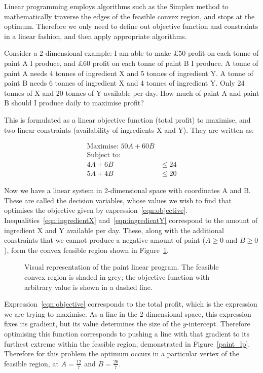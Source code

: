 Linear programming employs algorithms such as the Simplex method to
mathematically traverse the edges of the feasible convex region, and stops at
the optimum. Therefore we only need to define out objective function and
constraints in a linear fashion, and then apply appropriate algorithms.

Consider a 2-dimensional example: I am able to make $\pounds 50$ profit on each
tonne of paint A I produce, and $\pounds 60$ profit on each tonne of paint B I
produce. A tonne of paint A needs 4 tonnes of ingredient X and 5 tonnes of
ingredient Y. A tonne of paint B needs 6 tonnes of ingredient X and 4 tonnes of
ingredient Y. Only 24 tonnes of X and 20 tonnes of Y available per day. How much
of paint A and paint B should I produce daily to maximise profit?

This is formulated as a linear objective function (total profit) to maximise,
and two linear constraints (availability of ingredients X and Y). They are
written as:

\begin{align}
\text{Maximise: } 50 A + 60 B & \\\label{eqn:objective}
\text{Subject to: } & \nonumber \\
4 A + 6 B &\leq 24 \\\label{eqn:ingredientX}
5 A + 4 B &\leq 20 \label{eqn:ingredientY}
\end{align}

Now we have a linear system in 2-dimensional space with coordinates A and B.
These are called the decision variables, whose values we wish to find that
optimises the objective given by expression~\ref{eqn:objective}.
Inequalities~\ref{eqn:ingredientX} and~\ref{eqn:ingredientY} correspond to the
amount of ingredient X and Y available per day. These, along with the additional
constraints that we cannot produce a negative amount of paint
($A \geq 0$ and $B \geq 0$), form the convex feasible region shown in
Figure~\ref{fig:paint_lp}.

\begin{figure}
\begin{center}

\end{center}
\caption{Visual representation of the paint linear program. The feasible convex
region is shaded in grey; the objective function with arbitrary value is shown
in a dashed line.}
\label{fig:paint_lp}
\end{figure}

Expression~\ref{eqn:objective} corresponds to the total profit, which is the
expression we are trying to maximise. As a line in the 2-dimensional space, this
expression fixes its gradient, but its value determines the size of the
$y$-intercept. Therefore optimising this function corresponds to pushing a line
with that gradient to its furthest extreme within the feasible region,
demonstrated in Figure~\ref{paint_lp}.
Therefore for this problem the optimum occurs in a particular vertex of the
feasible region, at $A = \frac{12}{7}$ and $B = \frac{20}{7}$.

